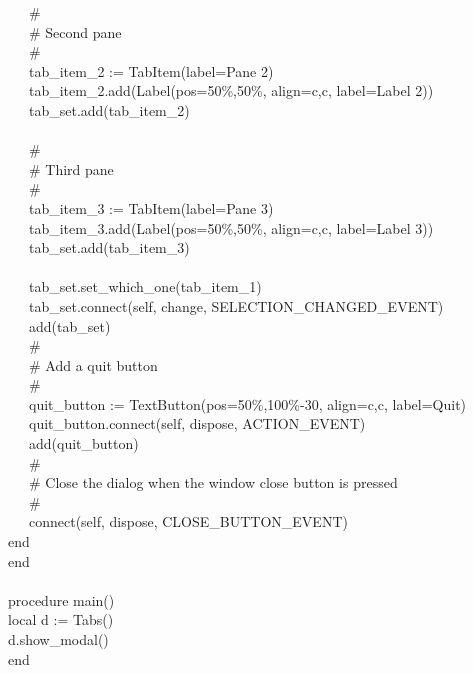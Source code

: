 {\>   \ \ \ \# \\
\>   \ \ \ \# Second pane \\
\>   \ \ \ \# \\
\>   \ \ \ tab\_item\_2 := TabItem({\textquotedbl}label=Pane
2{\textquotedbl}) \\
\>   \ \ \ tab\_item\_2.add(Label({\textquotedbl}pos=50\%,50\%{\textquotedbl},
{\textquotedbl}align=c,c{\textquotedbl}, {\textquotedbl}label=Label
2{\textquotedbl})) \\
\>   \ \ \ tab\_set.add(tab\_item\_2) \\
\ \\
\>   \ \ \ \# \\
\>   \ \ \ \# Third pane \\
\>   \ \ \ \# \\
\>   \ \ \ tab\_item\_3 := TabItem({\textquotedbl}label=Pane
3{\textquotedbl}) \\
\>   \ \ \ tab\_item\_3.add(Label({\textquotedbl}pos=50\%,50\%{\textquotedbl},
{\textquotedbl}align=c,c{\textquotedbl}, {\textquotedbl}label=Label
3{\textquotedbl})) \\
\>   \ \ \ tab\_set.add(tab\_item\_3) \\
\ \\
\>   \ \ \ tab\_set.set\_which\_one(tab\_item\_1) \\
\>   \ \ \ tab\_set.connect(self, {\textquotedbl}change{\textquotedbl},
SELECTION\_CHANGED\_EVENT) \\
\>   \ \ \ add(tab\_set) \\
\>   \ \ \ \# \\
\>   \ \ \ \# Add a quit button \\
\>   \ \ \ \# \\
\>   \ \ \ quit\_button :=
TextButton({\textquotedbl}pos=50\%,100\%-30{\textquotedbl},
{\textquotedbl}align=c,c{\textquotedbl},
{\textquotedbl}label=Quit{\textquotedbl}) \\
\>   \ \ \ quit\_button.connect(self,
{\textquotedbl}dispose{\textquotedbl}, ACTION\_EVENT) \\
\>   \ \ \ add(quit\_button) \\
\>   \ \ \ \# \\
\>   \ \ \ \# Close the dialog when the window close button is pressed \\
\>   \ \ \ \# \\
\>   \ \ \ connect(self, {\textquotedbl}dispose{\textquotedbl},
CLOSE\_BUTTON\_EVENT) \\
\>   end \\
end \\
\ \\
procedure main() \\
\>   local d := Tabs() \\
\>   d.show\_modal() \\
end
}

